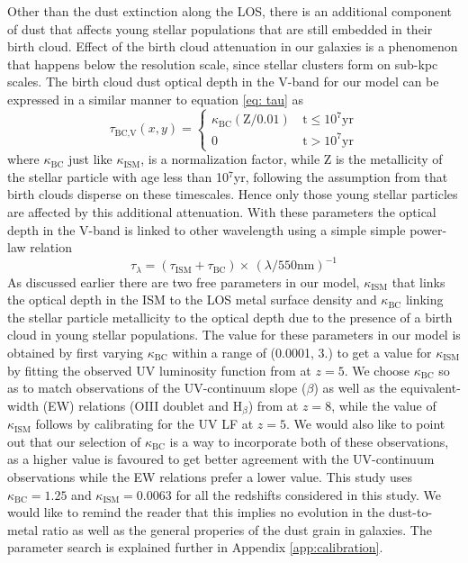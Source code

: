 Other than the dust extinction along the LOS, there is an additional component of dust that affects young stellar populations that are still embedded in their birth cloud. Effect of the birth cloud attenuation in our galaxies is a phenomenon that happens below the resolution scale, since stellar clusters form on sub-kpc scales. The birth cloud dust optical depth in the V-band for our model can be expressed in a similar manner to equation \ref{eq: tau} as
\begin{equation}
	\tau_{\textrm{BC,V}}(x,y) = 
	\begin{cases}
	\kappa_{\textrm{BC}} (\textrm{Z}/0.01)\, & \text{t} \leq 10^7\textrm{yr}\\
	0\, & \text{t} > 10^7\textrm{yr}
	\end{cases}
\end{equation}  
where $\kappa_{\textrm{BC}}$ just like $\kappa_{\textrm{ISM}}$, is a normalization factor, while Z is the metallicity of the stellar particle with age less than 10$^7$yr, following the assumption from \cite{Charlot_and_Fall2003} that birth clouds disperse on these timescales. Hence only those young stellar particles are affected by this additional attenuation. With these parameters the optical depth in the V-band is linked to other wavelength using a simple simple power-law relation
\begin{equation}\label{tau_lambda}
	\tau_{\lambda} = (\tau_{\textrm{ISM}} + \tau_{\textrm{BC}}) \times\,(\lambda/550\textrm{nm})^{-1}
\end{equation}
As discussed earlier there are two free parameters in our model, $\kappa_{\textrm{ISM}}$ that links the optical depth in the ISM to the LOS metal surface density and $\kappa_{\textrm{BC}}$ linking the stellar particle metallicity to the optical depth due to the presence of a birth cloud in young stellar populations. The value for these parameters in our model is obtained by first varying $\kappa_{\textrm{BC}}$ within a range of (0.0001, 3.) to get a value for $\kappa_{\textrm{ISM}}$ by fitting the observed UV luminosity function from \cite{Bouwens_2015a} at $z=5$. We choose $\kappa_{\textrm{BC}}$ so as to match observations of the UV-continuum slope ($\beta$) as well as the equivalent-width (EW) relations (OIII doublet and H$_{\beta}$) from \cite{deBarros19_OIIIHbeta} at $z=8$, while the value of $\kappa_{\textrm{ISM}}$ follows by calibrating for the UV LF at $z=5$. We would also like to point out that our selection of $\kappa_{\textrm{BC}}$ is a way to incorporate both of these observations, as a higher value is favoured to get better agreement with the UV-continuum observations while the EW relations prefer a lower value.  This study uses $\kappa_{\textrm{BC}}=1.25$ and $\kappa_{\textrm{ISM}}=0.0063$ for all the redshifts considered in this study. We would like to remind the reader that this implies no evolution in the dust-to-metal ratio as well as the general properies of the dust grain in galaxies. The parameter search is explained further in Appendix \ref{app:calibration}.

